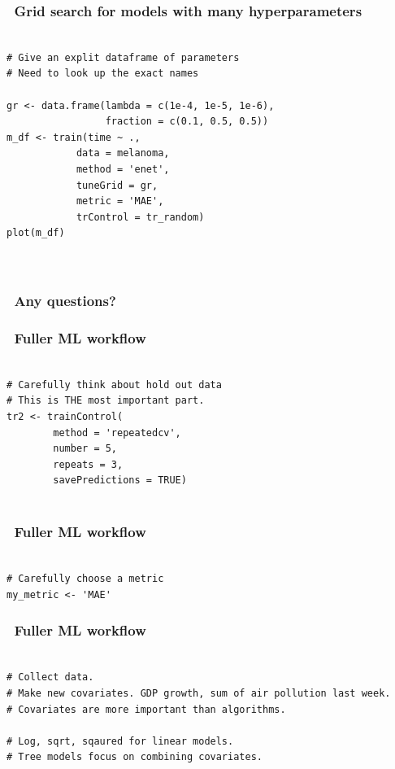 \documentclass[handout, aspectratio = 169]{beamer}
\begin{document}
\begin{frame}[fragile]
\frametitle{\insertframenumber~Grid search for models with many hyperparameters}
\begin{Verbatim}

# Give an explit dataframe of parameters
# Need to look up the exact names 

gr <- data.frame(lambda = c(1e-4, 1e-5, 1e-6),
                 fraction = c(0.1, 0.5, 0.5))
m_df <- train(time ~ ., 
            data = melanoma,
            method = 'enet',
            tuneGrid = gr,
            metric = 'MAE',
            trControl = tr_random)
plot(m_df)

            
\end{Verbatim}

\end{frame} 



\begin{frame}
\frametitle{\insertframenumber~Any questions?}


\end{frame} 




\begin{frame}[fragile]
\frametitle{\insertframenumber~Fuller ML workflow}
\begin{Verbatim}

# Carefully think about hold out data
# This is THE most important part.
tr2 <- trainControl(
        method = 'repeatedcv',
        number = 5,
        repeats = 3, 
        savePredictions = TRUE)


\end{Verbatim}

\end{frame} 


\begin{frame}[fragile]
\frametitle{\insertframenumber~Fuller ML workflow}
\begin{Verbatim}

# Carefully choose a metric
my_metric <- 'MAE'

\end{Verbatim}

\end{frame} 

	

\begin{frame}[fragile]
\frametitle{\insertframenumber~Fuller ML workflow}
\begin{Verbatim}

# Collect data.
# Make new covariates. GDP growth, sum of air pollution last week.
# Covariates are more important than algorithms.

# Log, sqrt, sqaured for linear models.
# Tree models focus on combining covariates.


\end{Verbatim}

\end{frame} 
\end{document}
